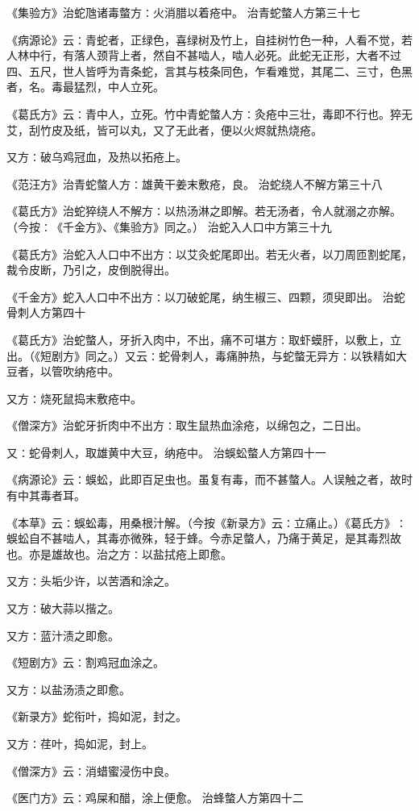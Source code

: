 \documentclass[a4paper,12pt,UTF8,twoside]{ctexbook}
\begin{document}
《集验方》治蛇虺诸毒螫方∶火消腊以着疮中。
治青蛇螫人方第三十七

《病源论》云∶青蛇者，正绿色，喜绿树及竹上，自挂树竹色一种，人看不觉，若人林中行，有落人颈背上者，然自不甚啮人，啮人必死。此蛇无正形，大者不过四、五尺，世人皆呼为青条蛇，言其与枝条同色，乍看难觉，其尾二、三寸，色黑者，名。毒最猛烈，中人立死。

《葛氏方》云∶青中人，立死。竹中青蛇螫人方∶灸疮中三壮，毒即不行也。猝无艾，刮竹皮及纸，皆可以丸，又了无此者，便以火烬就热烧疮。

又方∶破乌鸡冠血，及热以拓疮上。

《范汪方》治青蛇螫人方∶雄黄干姜末敷疮，良。
治蛇绕人不解方第三十八

《葛氏方》治蛇猝绕人不解方∶以热汤淋之即解。若无汤者，令人就溺之亦解。（今按∶《千金方》、《集验方》同之。）
治蛇入人口中方第三十九

《葛氏方》治蛇入人口中不出方∶以艾灸蛇尾即出。若无火者，以刀周匝割蛇尾，裁令皮断，乃引之，皮倒脱得出。

《千金方》蛇入人口中不出方∶以刀破蛇尾，纳生椒三、四颗，须臾即出。
治蛇骨刺人方第四十

《葛氏方》治蛇螫人，牙折入肉中，不出，痛不可堪方∶取虾蟆肝，以敷上，立出。（《短剧方》同之。）又云∶蛇骨刺人，毒痛肿热，与蛇螫无异方∶以铁精如大豆者，以管吹纳疮中。

又方∶烧死鼠捣末敷疮中。

《僧深方》治蛇牙折肉中不出方∶取生鼠热血涂疮，以绵包之，二日出。

又∶蛇骨刺人，取雄黄中大豆，纳疮中。
治蜈蚣螫人方第四十一

《病源论》云∶蜈蚣，此即百足虫也。虽复有毒，而不甚螫人。人误触之者，故时有中其毒者耳。

《本草》云∶蜈蚣毒，用桑根汁解。（今按《新录方》云∶立痛止。）《葛氏方》∶蜈蚣自不甚啮人，其毒亦微殊，轻于蜂。今赤足螫人，乃痛于黄足，是其毒烈故也。亦是雄故也。治之方∶以盐拭疮上即愈。

又方∶头垢少许，以苦酒和涂之。

又方∶破大蒜以揩之。

又方∶蓝汁渍之即愈。

《短剧方》云∶割鸡冠血涂之。

又方∶以盐汤渍之即愈。

《新录方》蛇衔叶，捣如泥，封之。

又方∶荏叶，捣如泥，封上。

《僧深方》云∶消蜡蜜浸伤中良。

《医门方》云∶鸡屎和醋，涂上便愈。
治蜂螫人方第四十二
\end{document}
